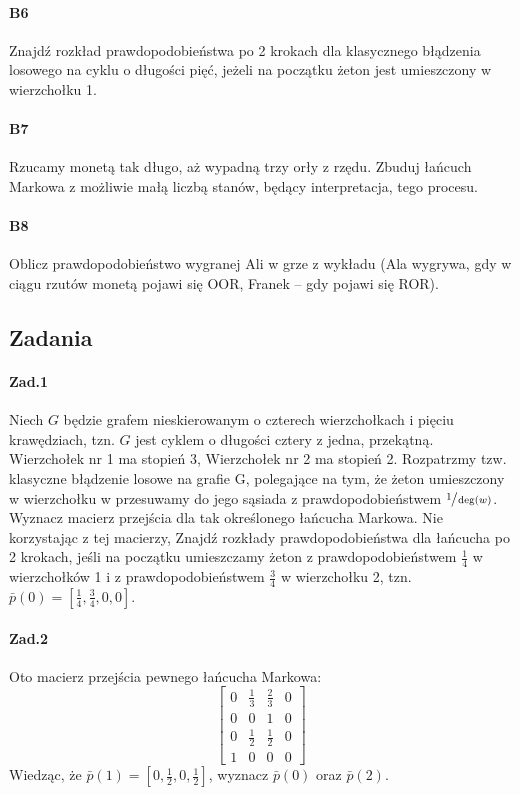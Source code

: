 \documentclass[a4paper,12pt]{article}
\theoremstyle{definition}%
\theoremstyle{definition}
\theoremstyle{problem}
\begin{document}
\paragraph{B6} Znajdź rozkład prawdopodobieństwa po 2 krokach dla klasycznego błądzenia losowego na cyklu o długości pięć, jeżeli na początku żeton jest umieszczony w wierzchołku 1.

\paragraph{B7} Rzucamy monetą
tak długo, aż wypadną trzy orły z rzędu. Zbuduj łańcuch Markowa z możliwie małą liczbą stanów, będący interpretacja, tego procesu.

\paragraph{B8} Oblicz prawdopodobieństwo wygranej Ali w grze z wykładu (Ala wygrywa, gdy w ciągu rzutów monetą pojawi się OOR, Franek – gdy pojawi się ROR).

\subsection{Zadania}
\paragraph{Zad.1} Niech $G$ będzie grafem nieskierowanym o czterech wierzchołkach i pięciu krawędziach, tzn. $G$ jest cyklem o długości cztery z jedna, przekątną. Wierzchołek nr 1 ma stopień 3, Wierzchołek nr 2 ma stopień 2. Rozpatrzmy tzw. klasyczne błądzenie losowe na grafie G, polegające na tym, że żeton umieszczony w wierzchołku w przesuwamy do jego sąsiada z prawdopodobieństwem $\sfrac{1}{\deg (w)}$. Wyznacz macierz przejścia dla tak określonego łańcucha Markowa. Nie korzystając z tej macierzy, Znajdź rozkłady prawdopodobieństwa dla łańcucha po 2 krokach, jeśli na początku umieszczamy żeton z prawdopodobieństwem $\frac{1}{4}$ w wierzchołków 1 i z prawdopodobieństwem $\frac{3}{4}$ w wierzchołku 2, tzn. $\bar{p}(0) =\left[ \frac{1}{4}, \frac{3}{4}, 0, 0\right]$.

\paragraph{Zad.2} Oto macierz przejścia pewnego łańcucha Markowa: 
$$\begin{bmatrix}
0&\frac{1}{3}&\frac{2}{3}&0\\
0&0&1&0\\
0&\frac{1}{2}&\frac{1}{2}&0\\
1&0&0&0
\end{bmatrix}$$
Wiedząc, że $\bar{p}(1) = \left[0,\frac{1}{2}, 0,\frac{1}{2}\right]$, wyznacz $\bar{p}(0)$ oraz $\bar{p}(2)$.
\end{document}
